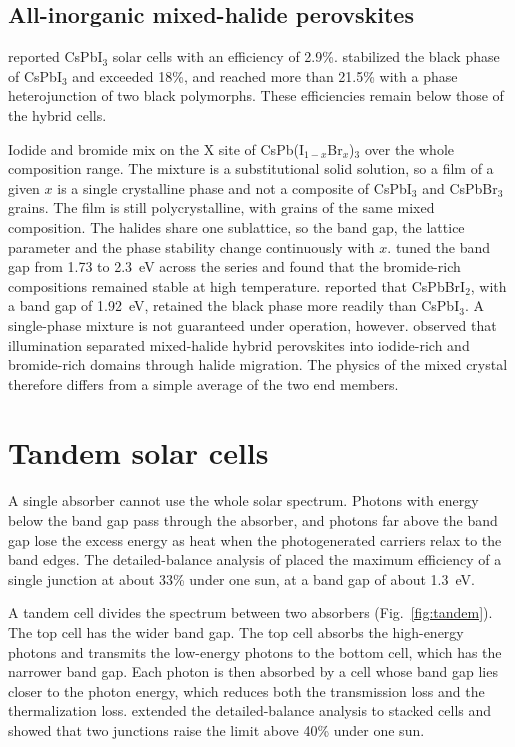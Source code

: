 \subsection{All-inorganic mixed-halide perovskites}

\citet{Eperon2015} reported CsPbI$_3$ solar cells with an efficiency of 2.9\%. \citet{Wang2019} stabilized the black phase of CsPbI$_3$ and exceeded 18\%, and \citet{Mali2023} reached more than 21.5\% with a phase heterojunction of two black polymorphs. These efficiencies remain below those of the hybrid cells.

Iodide and bromide mix on the X site of CsPb(I$_{1-x}$Br$_x$)$_3$ over the whole composition range. The mixture is a substitutional solid solution, so a film of a given $x$ is a single crystalline phase and not a composite of CsPbI$_3$ and CsPbBr$_3$ grains. The film is still polycrystalline, with grains of the same mixed composition. The halides share one sublattice, so the band gap, the lattice parameter and the phase stability change continuously with $x$. \citet{Sutton2016} tuned the band gap from 1.73 to 2.3~eV across the series and found that the bromide-rich compositions remained stable at high temperature. \citet{Beal2016} reported that CsPbBrI$_2$, with a band gap of 1.92~eV, retained the black phase more readily than CsPbI$_3$. A single-phase mixture is not guaranteed under operation, however. \citet{Hoke2015} observed that illumination separated mixed-halide hybrid perovskites into iodide-rich and bromide-rich domains through halide migration. The physics of the mixed crystal therefore differs from a simple average of the two end members.

\section{Tandem solar cells}
\label{sec:tandem}

A single absorber cannot use the whole solar spectrum. Photons with energy below the band gap pass through the absorber, and photons far above the band gap lose the excess energy as heat when the photogenerated carriers relax to the band edges. The detailed-balance analysis of \citet{Shockley1961} placed the maximum efficiency of a single junction at about 33\% under one sun, at a band gap of about 1.3~eV.

A tandem cell divides the spectrum between two absorbers (Fig.~\ref{fig:tandem}). The top cell has the wider band gap. The top cell absorbs the high-energy photons and transmits the low-energy photons to the bottom cell, which has the narrower band gap. Each photon is then absorbed by a cell whose band gap lies closer to the photon energy, which reduces both the transmission loss and the thermalization loss. \citet{DeVos1980} extended the detailed-balance analysis to stacked cells and showed that two junctions raise the limit above 40\% under one sun.

